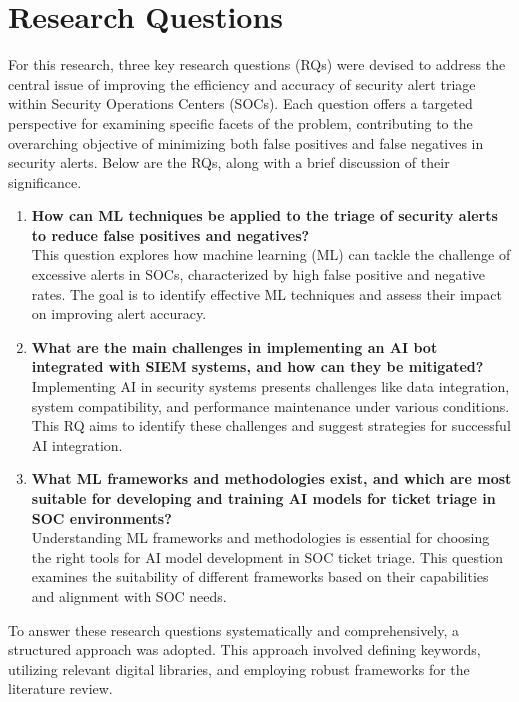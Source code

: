 \section{Research Questions}

For this research, three key research questions (RQs) were devised to address the central issue of improving the efficiency and accuracy of security alert triage within Security Operations Centers (SOCs). 
Each question offers a targeted perspective for examining specific facets of the problem, contributing to the overarching objective of minimizing both false positives and false negatives in security alerts. 
Below are the RQs, along with a brief discussion of their significance.

\begin{enumerate}
    \item \textbf{How can ML techniques be applied to the triage of security alerts to reduce false positives and negatives?} \\
    This question explores how machine learning (ML) can tackle the challenge of excessive alerts in SOCs, characterized by high false positive and negative rates. The goal is to identify effective ML techniques and assess their impact on improving alert accuracy.
    
    \item \textbf{What are the main challenges in implementing an AI bot integrated with SIEM systems, and how can they be mitigated?} \\
    Implementing AI in security systems presents challenges like data integration, system compatibility, and performance maintenance under various conditions. This RQ aims to identify these challenges and suggest strategies for successful AI integration.
    
    \item \textbf{What ML frameworks and methodologies exist, and which are most suitable for developing and training AI models for ticket triage in SOC environments?} \\
    Understanding ML frameworks and methodologies is essential for choosing the right tools for AI model development in SOC ticket triage. This question examines the suitability of different frameworks based on their capabilities and alignment with SOC needs.
\end{enumerate}

To answer these research questions systematically and comprehensively, a structured approach was adopted. 
This approach involved defining keywords, utilizing relevant digital libraries, and employing robust frameworks for the literature review.

